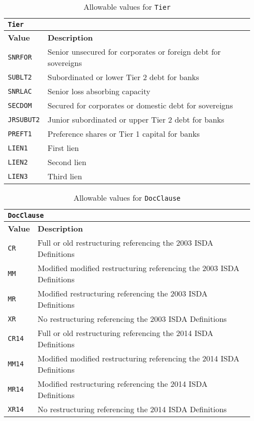 \begin{table}[H]
\centering
  \begin{tabular} {|p{3cm}|p{12cm}|}
    \hline
    \multicolumn{2}{|l|}{\lstinline!Tier!} \\
    \hline
    \textbf{Value} & \textbf{Description} \\
    \hline
    \lstinline!SNRFOR! & Senior unsecured for corporates or foreign debt for sovereigns \\
    \hline
    \lstinline!SUBLT2! & Subordinated or lower Tier 2 debt for banks \\
    \hline
    \lstinline!SNRLAC! & Senior loss absorbing capacity \\
    \hline
    \lstinline!SECDOM! & Secured for corporates or domestic debt for sovereigns \\
    \hline
    \lstinline!JRSUBUT2! & Junior subordinated or upper Tier 2 debt for banks \\
    \hline
    \lstinline!PREFT1! & Preference shares or Tier 1 capital for banks \\
    \hline
    \lstinline!LIEN1! & First lien \\
    \hline
    \lstinline!LIEN2! & Second lien \\
    \hline
    \lstinline!LIEN3! & Third lien \\
    \hline
  \end{tabular}
  \caption{Allowable values for \lstinline!Tier!}
  \label{tab:tier_data}
\end{table}

\begin{table}[H]
\centering
  \begin{tabular} {|p{3cm}|p{12cm}|}
    \hline
    \multicolumn{2}{|l|}{\lstinline!DocClause!} \\
    \hline
    \textbf{Value} & \textbf{Description} \\
    \hline
    \lstinline!CR! & Full or old restructuring referencing the 2003 ISDA Definitions \\
    \hline
    \lstinline!MM! & Modified modified restructuring referencing the 2003 ISDA Definitions \\
    \hline
    \lstinline!MR! & Modified restructuring referencing the 2003 ISDA Definitions \\
    \hline
    \lstinline!XR! & No restructuring referencing the 2003 ISDA Definitions \\
    \hline
    \lstinline!CR14! & Full or old restructuring referencing the 2014 ISDA Definitions \\
    \hline
    \lstinline!MM14! & Modified modified restructuring referencing the 2014 ISDA Definitions \\
    \hline
    \lstinline!MR14! & Modified restructuring referencing the 2014 ISDA Definitions \\
    \hline
    \lstinline!XR14! & No restructuring referencing the 2014 ISDA Definitions \\
    \hline
  \end{tabular}
  \caption{Allowable values for \lstinline!DocClause!}
  \label{tab:docclause_data}
\end{table}

